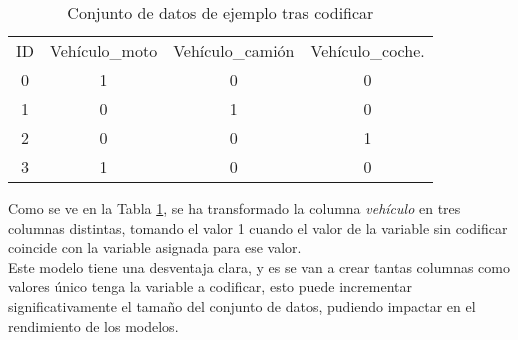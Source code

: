 \begin{table}[H]
	\centering
	\begin{tabular}{|c|c|c|c|}
		\cline{1-4}
		ID & Vehículo\_moto & Vehículo\_camión & Vehículo\_coche. \\ \cline{1-4}
		0  & 1              & 0                & 0                \\ \cline{1-4}
		1  & 0              & 1                & 0                \\ \cline{1-4}
		2  & 0              & 0                & 1                \\ \cline{1-4}
		3  & 1              & 0                & 0                \\ \cline{1-4}
	\end{tabular}
	\caption{Conjunto de datos de ejemplo tras codificar}
	\label{tab:conjunto_ejemplo_cod}
\end{table}
Como se ve en la Tabla \ref{tab:conjunto_ejemplo_cod}, se ha transformado la columna \textit{vehículo} en tres columnas distintas, tomando el valor 1 cuando el valor de la variable sin codificar coincide con la variable asignada para ese valor. \\
\linebreak
Este modelo tiene una desventaja clara, y es se van a crear tantas columnas como valores único tenga la variable a codificar, esto puede incrementar significativamente el tamaño del conjunto de datos, pudiendo impactar en el rendimiento de los modelos.
